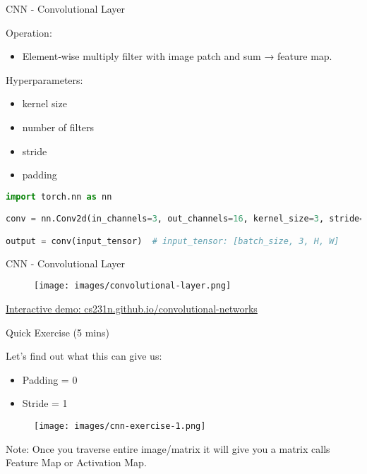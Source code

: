 \begin{frame}[fragile]{CNN - Convolutional Layer}
\begin{block}{Operation:}
    \begin{itemize}
        \item Element‑wise multiply filter with image patch and sum → feature map.
    \end{itemize}
\end{block}

\begin{block}{Hyperparameters:}
    \begin{itemize}
        \item kernel size
        \item number of filters
        \item stride
        \item padding
    \end{itemize}
\end{block}

\begin{lstlisting}[language=Python, caption={Code snippet (PyTorch)}]
import torch.nn as nn

conv = nn.Conv2d(in_channels=3, out_channels=16, kernel_size=3, stride=1, padding=1)

output = conv(input_tensor)  # input_tensor: [batch_size, 3, H, W]
\end{lstlisting}
\end{frame}  

\begin{frame}{CNN - Convolutional Layer}
    \begin{figure}
    \centering
    \texttt{[image: images/convolutional-layer.png]}
    \end{figure}

    \href{https://cs231n.github.io/convolutional-networks/}{Interactive demo: cs231n.github.io/convolutional-networks}
\end{frame}

\begin{frame}{Quick Exercise (5 mins)}
    \begin{block}{Let’s find out what this can give us:}
        \begin{itemize}
            \item Padding = 0
            \item Stride = 1
        \end{itemize}
    \end{block}
    \begin{figure}
    \centering
    \texttt{[image: images/cnn-exercise-1.png]}
    \end{figure}

    Note: Once you traverse entire image/matrix it will give you a matrix calls Feature Map or Activation Map.
\end{frame}